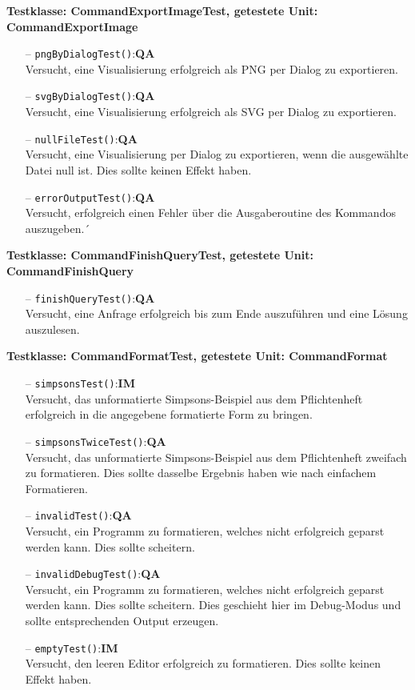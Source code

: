 \documentclass[parskip=full,11pt,twoside]{scrartcl}
\def\qa{\hfill\textbf{QA}}
\def\impl{\hfill\textbf{IM}}
\begin{document}
\textbf{Testklasse: CommandExportImageTest, getestete Unit: CommandExportImage}
\begin{itemize}
	\item[--] \texttt{pngByDialogTest()}:\qa\\
	Versucht, eine Visualisierung erfolgreich als PNG per Dialog zu exportieren.
	\item[--] \texttt{svgByDialogTest()}:\qa\\
	Versucht, eine Visualisierung erfolgreich als SVG per Dialog zu exportieren.
	\item[--] \texttt{nullFileTest()}:\qa\\
	Versucht, eine Visualisierung per Dialog zu exportieren, wenn die ausgewählte Datei null ist. Dies sollte keinen Effekt haben.
	\item[--] \texttt{errorOutputTest()}:\qa\\
	Versucht, erfolgreich einen Fehler über die Ausgaberoutine des Kommandos auszugeben.´
\end{itemize}

\textbf{Testklasse: CommandFinishQueryTest, getestete Unit: CommandFinishQuery}
\begin{itemize}
	\item[--] \texttt{finishQueryTest()}:\qa\\
	Versucht, eine Anfrage erfolgreich bis zum Ende auszuführen und eine Lösung auszulesen.
\end{itemize}

\textbf{Testklasse: CommandFormatTest, getestete Unit: CommandFormat}
\begin{itemize}
	\item[--] \texttt{simpsonsTest()}:\impl\\
	Versucht, das unformatierte Simpsons-Beispiel aus dem Pflichtenheft erfolgreich in die angegebene formatierte Form zu bringen.
	\item[--] \texttt{simpsonsTwiceTest()}:\qa\\
	Versucht, das unformatierte Simpsons-Beispiel aus dem Pflichtenheft zweifach zu formatieren. Dies sollte dasselbe Ergebnis haben wie nach einfachem Formatieren.
	\item[--] \texttt{invalidTest()}:\qa\\
	Versucht, ein Programm zu formatieren, welches nicht erfolgreich geparst werden kann. Dies sollte scheitern.
	\item[--] \texttt{invalidDebugTest()}:\qa\\
	Versucht, ein Programm zu formatieren, welches nicht erfolgreich geparst werden kann. Dies sollte scheitern. Dies geschieht hier im Debug-Modus und sollte entsprechenden Output erzeugen.
	\item[--] \texttt{emptyTest()}:\impl\\
	Versucht, den leeren Editor erfolgreich zu formatieren. Dies sollte keinen Effekt haben.
\end{itemize}
\end{document}
